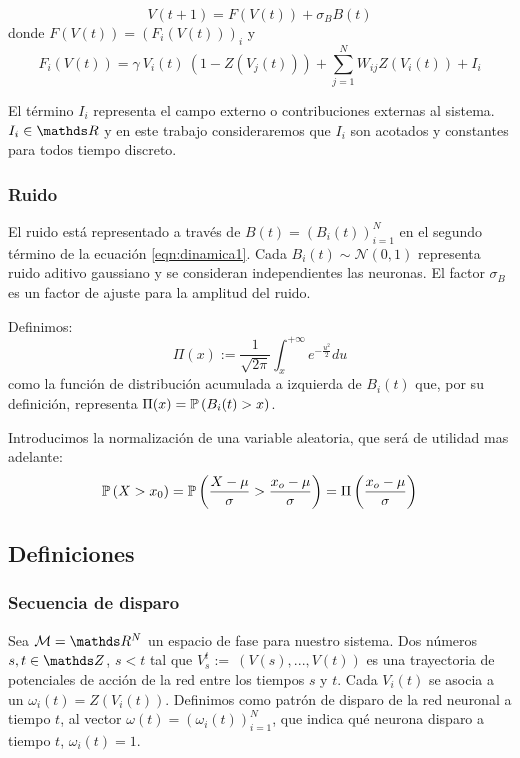 \begin{equation}
    V(t+1) = F(V(t)) + \sigma_B B(t)
    \label{eqn:dinamica1}
\end{equation}
donde $F(V(t)) = \left(F_i(V(t))\right)_i$ y
\begin{equation}
    F_i(V(t)) = \gamma\ V_i(t)\ (1-Z(V_j(t))) + \sum_{j=1}^N W_{ij} Z(V_i(t)) +I_i 
    \label{eqn:dinamica2}
\end{equation}

El término $I_i$ representa el campo externo o contribuciones externas al sistema. $I_i \in \reals$ y en este trabajo consideraremos que $I_i$ son acotados y constantes para todos tiempo discreto.

\subsubsection{Ruido}

El ruido está representado a través de $B(t)=(B_i(t))^N_{i=1}$ en el segundo término de la ecuación \eqref{eqn:dinamica1}. Cada $B_i(t)\sim\mathcal{N}(0,1)$ representa ruido aditivo gaussiano y se consideran independientes las neuronas. El factor $\sigma_B$ es un factor de ajuste para la amplitud del ruido.

Definimos:
\begin{equation}
    \Pi(x) := \frac{1}{\sqrt{2\pi}} \int_x^{+\infty} e^{-\frac{u^2}{2}} du
\end{equation}
como la función de distribución acumulada a izquierda de $B_i(t)$ que, por su definición, representa  $\Pi(x)=\mathbb{P}\left(B_i(t)>x\right)$.

Introducimos la normalización de una variable aleatoria, que será de utilidad mas adelante:
\begin{equation}
    \mathbb{P}\left(X>x_0\right) = \mathbb{P}\left(\frac{X-\mu}{\sigma}>\frac{x_o-\mu}{\sigma}\right) = \Pi\left(\frac{x_o-\mu}{\sigma}\right)
    \label{eqn:normgauss}
\end{equation}

\subsection{Definiciones}

\subsubsection{Secuencia de disparo}

Sea $\mathcal{M}=\reals^N$ un espacio de fase para nuestro sistema. Dos números $s,t \in \enteros$, $s<t$ tal que $V_s^t:=~\!\!(V(s),...,V(t))$ es una trayectoria de potenciales de acción de la red entre los tiempos $s$ y $t$. Cada $V_i(t)$ se asocia a un $\omega_i(t) = Z(V_i(t))$. Definimos como patrón de disparo de la red neuronal a tiempo $t$, al vector $\omega(t)=(\omega_i(t))^N_{i=1}$, que indica qué neurona disparo a tiempo $t$, $\omega_i(t)=1$.

